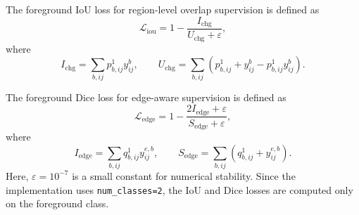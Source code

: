         The foreground IoU loss for region-level overlap supervision is defined as
        \begin{equation}
            \mathcal{L}_{\text{iou}}
            =
            1-\frac{I_{\text{chg}}}{U_{\text{chg}}+\varepsilon},
            \label{eq:iou_loss}
        \end{equation}
        where
        \begin{equation}
            I_{\text{chg}}=\sum_{b,ij}p^{1}_{b,ij}y^{b}_{ij},
            \qquad
            U_{\text{chg}}=\sum_{b,ij}\left(p^{1}_{b,ij}+y^{b}_{ij}-p^{1}_{b,ij}y^{b}_{ij}\right).
            \label{eq:iou_components}
        \end{equation}

        The foreground Dice loss for edge-aware supervision is defined as
        \begin{equation}
            \mathcal{L}_{\text{edge}}
            =
            1-\frac{2I_{\text{edge}}+\varepsilon}{S_{\text{edge}}+\varepsilon},
            \label{eq:edge_loss}
        \end{equation}
        where
        \begin{equation}
            I_{\text{edge}}=\sum_{b,ij}q^{1}_{b,ij}y^{e,b}_{ij},
            \qquad
            S_{\text{edge}}=\sum_{b,ij}\left(q^{1}_{b,ij}+y^{e,b}_{ij}\right).
            \label{eq:edge_components}
        \end{equation}
        Here, $\varepsilon=10^{-7}$ is a small constant for numerical stability. Since the implementation uses \texttt{num\_classes=2}, the IoU and Dice losses are computed only on the foreground class.